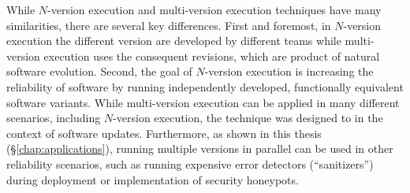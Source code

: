 

While $N$-version execution and multi-version execution techniques have many
similarities, there are several key differences. First and foremost, in
$N$-version execution the different version are developed by different teams
while multi-version execution uses the consequent revisions, which are product
of natural software evolution. Second, the goal of $N$-version execution is
increasing the reliability of software by running independently developed,
functionally equivalent software variants. While multi-version execution can be
applied in many different scenarios, including $N$-version execution, the
technique was designed to in the context of software updates. Furthermore, as
shown in this thesis (\S\ref{chap:applications}), running multiple versions in
parallel can be used in other reliability scenarios, such as running expensive
error detectors (``sanitizers'') during deployment or implementation of
security honeypots.


